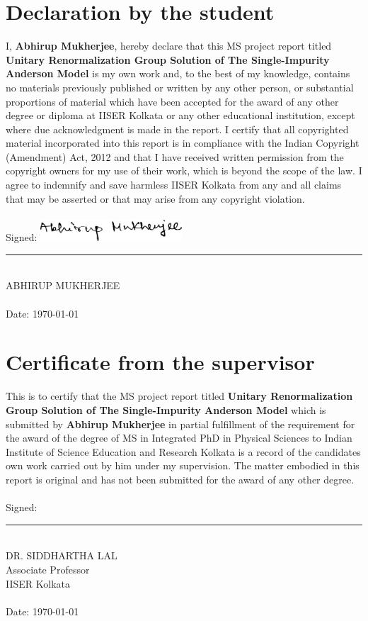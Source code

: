 \documentclass[twoside,11pt]{report}
\numberwithin{equation}{section}
\begin{document}
\chapter*{Declaration by the student}
I, {\large\textbf{Abhirup Mukherjee}}, hereby declare that this MS project report titled {\large\textbf{Unitary Renormalization Group Solution of The Single-Impurity Anderson Model}} is my own work and, to the best of my knowledge, contains no materials previously published or written by any other person, or substantial proportions of material which have been accepted for the award of any other degree or diploma at IISER Kolkata or any other educational institution, except where due acknowledgment is made in the report. I certify that all copyrighted material incorporated into this report is in compliance with the Indian Copyright (Amendment) Act, 2012 and that I have received written permission from the copyright owners for my use of their work, which is beyond the scope of the law. I agree to indemnify and save harmless IISER Kolkata from any and all claims that may be asserted or that may arise from any copyright violation.
\\\\
Signed:
\hspace{30pt}\includegraphics[width=150pt]{../figures/signature_black.png}
\\
\rule[1em]{0.5\linewidth}{0.5pt}\\  %
ABHIRUP MUKHERJEE
\\\\
Date:
\today

\chapter*{Certificate from the supervisor}
This is to certify that the MS project report titled {\large\textbf{Unitary Renormalization Group Solution of The Single-Impurity Anderson Model}} which is submitted by {\large\textbf{Abhirup Mukherjee}} in partial fulfillment of the requirement for the award of the degree of MS in Integrated PhD in Physical Sciences to Indian Institute of Science Education and Research Kolkata is a record of the candidates own work carried out by him under my supervision. The matter embodied in this report is original and has not been submitted for the award of any other degree.
\\\\
Signed:\\[10pt]
\rule[1em]{0.5\linewidth}{0.5pt}\\  %
DR. SIDDHARTHA LAL\\
Associate Professor\\
IISER Kolkata
\\\\
Date:
\today
\end{document}
